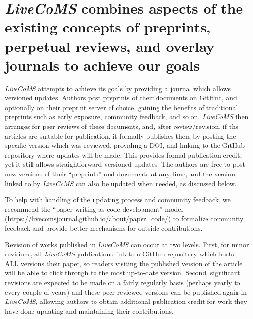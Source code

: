 \documentclass[9pt,editorial]{livecoms}
\begin{document}
\section{\emph{LiveCoMS} combines aspects of the existing concepts of preprints, perpetual reviews, and overlay journals to achieve our goals}

\emph{LiveCoMS} attempts to achieve its goals by providing a journal which allows versioned updates.
Authors post preprints of their documents on GitHub, and optionally on their preprint server of choice, gaining the benefits of traditional preprints such as early exposure, community feedback, and so on. 
\emph{LiveCoMS} then arranges for peer reviews of these documents, and, after review/revision, if the articles are suitable for publication, it formally publishes them by posting the specific version which was reviewed, providing a DOI, and linking to the GitHub repository where updates will be made.
This provides formal publication credit, yet it still allows straightforward versioned updates.
The authors are free to post new versions of their ``preprints'' and documents at any time, and the version linked to by \emph{LiveCoMS} can also be updated when needed, as discussed below.

To help with handling of the updating process and community feedback, we recommend the ``paper writing as code development'' model (\url{https://livecomsjournal.github.io/about/paper_code/}) to formalize community feedback and provide better mechanisms for outside contributions. 

Revision of works published in \emph{LiveCoMS} can occur at two levels. 
First, for minor revisions, all \emph{LiveCoMS} publications link to a GitHub repository which hosts ALL versions their paper, so readers visiting the published version of the article will be able to click through to the most up-to-date version.
Second, significant revisions are expected to be made on a fairly regularly basis (perhaps yearly to every couple of years) and these peer-reviewed versions can be published again in \emph{LiveCoMS}, allowing authors to obtain additional publication credit for work they have done updating and maintaining their contributions. 
\end{document}
